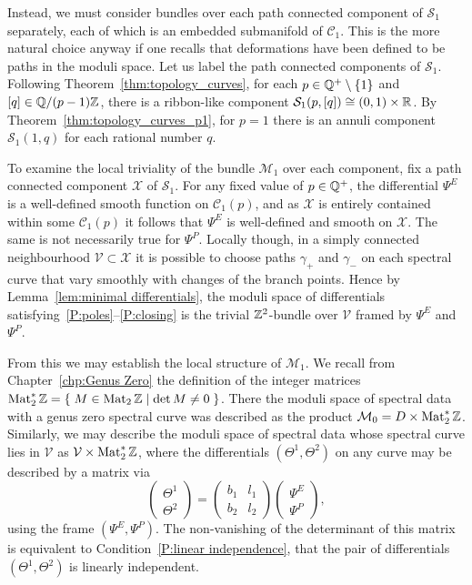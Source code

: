 Instead, we must consider bundles over each path connected component of $\mathcal{S}_1$ separately, each of which is an embedded submanifold of $\mathcal{C}_1$. This is the more natural choice anyway if one recalls that deformations have been defined to be paths in the moduli space.
Let us label the path connected components of $\mathcal{S}_1$. Following Theorem~\ref{thm:topology_curves}, for each $p\in \Q^+\setminus\{1\}$ and $[q] \in \Q / (p-1) \Z$, there is a ribbon-like component $\mathcal{S}_1(p,[q]) \diffeo (0,1)\times\R$. By Theorem~\ref{thm:topology_curves_p1}, for $p=1$ there is an annuli component $\mathcal{S}_1(1,q)$ for each rational number $q$.

To examine the local triviality of the bundle $\mathcal{M}_1$ over each component, fix a path connected component $\mathcal{X}$ of $\mathcal{S}_1$. For any fixed value of $p \in \Q^+$, the differential $Ψ^E$ is a well-defined smooth function on $\mathcal{C}_1(p)$, and as $\mathcal{X}$ is entirely contained within some $\mathcal{C}_1(p)$ it follows that $Ψ^E$ is well-defined and smooth on $\mathcal{X}$. The same is not necessarily true for $Ψ^P$.
Locally though, in a simply connected neighbourhood $\mathcal{V} \subset \mathcal{X}$ it is possible to choose paths $γ_+$ and $γ_-$ on each spectral curve that vary smoothly with changes of the branch points. Hence by Lemma~\ref{lem:minimal differentials}, the moduli space of differentials satisfying~\ref{P:poles}--\ref{P:closing} is the trivial $\Z^2$-bundle over $\mathcal{V}$ framed by $Ψ^E$ and $Ψ^P$.

From this we may establish the local structure of $\mathcal{M}_1$.
We recall from Chapter~\ref{chp:Genus Zero} the definition of the integer matrices $\Mat_2^*\Z = \Set{ M \in \Mat_2\Z }{\det M \neq 0}$. There the moduli space of spectral data with a genus zero spectral curve was described as the product $\mathcal{M}_0 = D \times \Mat_2^*\Z$. Similarly, we may describe the moduli space of spectral data whose spectral curve lies in $\mathcal{V}$ as $\mathcal{V} \times \Mat_2^*\Z$, where the differentials $(Θ^1,Θ^2)$ on any curve may be described by a matrix via
\[
\begin{pmatrix}
Θ^1 \\ Θ^2
\end{pmatrix}
=
\begin{pmatrix}
b_1 & l_1 \\
b_2 & l_2
\end{pmatrix}
\begin{pmatrix}
Ψ^E \\ Ψ^P
\end{pmatrix},
\]
using the frame $(Ψ^E,Ψ^P)$. The non-vanishing of the determinant of this matrix is equivalent to Condition~\ref{P:linear independence}, that the pair of differentials $(Θ^1,Θ^2)$ is linearly independent.


